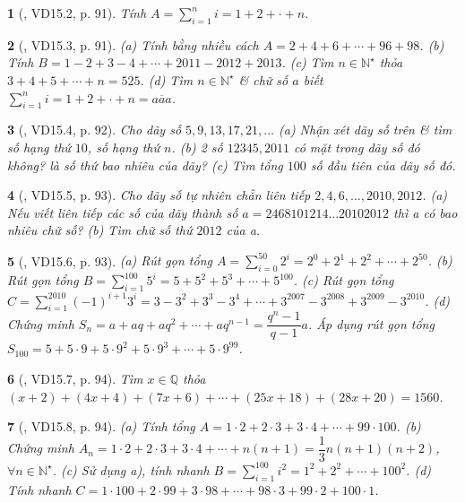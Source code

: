\documentclass{article}
\newtheorem{baitoan}{}
\begin{document}
\begin{baitoan}[\cite{TLCT_THCS_Toan_6_so_hoc}, VD15.2, p. 91]
	Tính $A = \sum_{i=1}^n i = 1 + 2 + \cdot + n$.
\end{baitoan}

\begin{baitoan}[\cite{TLCT_THCS_Toan_6_so_hoc}, VD15.3, p. 91]
	(a) Tính bằng nhiều cách $A = 2 + 4 + 6 + \cdots + 96 + 98$. (b) Tính $B = 1 - 2 + 3 - 4 + \cdots + 2011 - 2012 + 2013$. (c) Tìm $n\in\mathbb{N}^\star$ thỏa $3 + 4 + 5 + \cdots + n = 525$. (d) Tìm $n\in\mathbb{N}^\star$ \& chữ số $a$ biết $\sum_{i=1}^n i = 1 + 2 + \cdot + n = \overline{aaa}$.
\end{baitoan}

\begin{baitoan}[\cite{TLCT_THCS_Toan_6_so_hoc}, VD15.4, p. 92]
	Cho dãy số $5,9,13,17,21,\ldots$ (a) Nhận xét dãy số trên \& tìm số hạng thứ $10$, số hạng thứ $n$. (b) 2 số $12345,2011$ có mặt trong dãy số đó không? là số thứ bao nhiêu của dãy? (c) Tìm tổng $100$ số đầu tiên của dãy số đó.
\end{baitoan}

\begin{baitoan}[\cite{TLCT_THCS_Toan_6_so_hoc}, VD15.5, p. 93]
	Cho dãy số tự nhiên chẵn liên tiếp $2,4,6,\ldots,2010,2012$. (a) Nếu viết liên tiếp các số của dãy thành số $a = 2468101214\ldots20102012$ thì a có bao nhiêu chữ số? (b) Tìm chữ số thứ $2012$ của a.
\end{baitoan}

\begin{baitoan}[\cite{TLCT_THCS_Toan_6_so_hoc}, VD15.6, p. 93]
	(a) Rút gọn tổng $A = \sum_{i=0}^{50} 2^i = 2^0 + 2^1 + 2^2 + \cdots + 2^{50}$. (b) Rút gọn tổng $B = \sum_{i=1}^{100} 5^i = 5 + 5^2 + 5^3 + \cdots + 5^{100}$. (c) Rút gọn tổng $C = \sum_{i=1}^{2010} (-1)^{i+1}3^i = 3 - 3^2 + 3^3 - 3^4 + \cdots + 3^{2007} - 3^{2008} + 3^{2009} - 3^{2010}$. (d) Chứng minh $S_n =  a + aq+ aq^2 + \cdots + aq^{n-1} = \dfrac{q^n - 1}{q - 1}a$. Áp dụng rút gọn tổng $S_{100} = 5 + 5\cdot9 + 5\cdot9^2 + 5\cdot9^3 + \cdots + 5\cdot9^{99}$.
\end{baitoan}

\begin{baitoan}[\cite{TLCT_THCS_Toan_6_so_hoc}, VD15.7, p. 94]
	Tìm $x\in\mathbb{Q}$ thỏa $(x + 2) + (4x + 4) + (7x + 6) + \cdots + (25x + 18) + (28x + 20) = 1560$.
\end{baitoan}

\begin{baitoan}[\cite{TLCT_THCS_Toan_6_so_hoc}, VD15.8, p. 94]
	(a) Tính tổng $A = 1\cdot2 + 2\cdot3 + 3\cdot4 + \cdots + 99\cdot100$. (b) Chứng minh $A_n = 1\cdot2 + 2\cdot3 + 3\cdot4 + \cdots + n(n + 1) = \dfrac{1}{3}n(n + 1)(n + 2)$, $\forall n\in\mathbb{N}^\star$. (c) Sử dụng a), tính nhanh $B = \sum_{i=1}^{100} i^2 = 1^2 + 2^2 + \cdots + 100^2$. (d) Tính nhanh $C = 1\cdot100 + 2\cdot99 + 3\cdot98 + \cdots + 98\cdot3 + 99\cdot2 + 100\cdot1$.
\end{baitoan}
\end{document}
